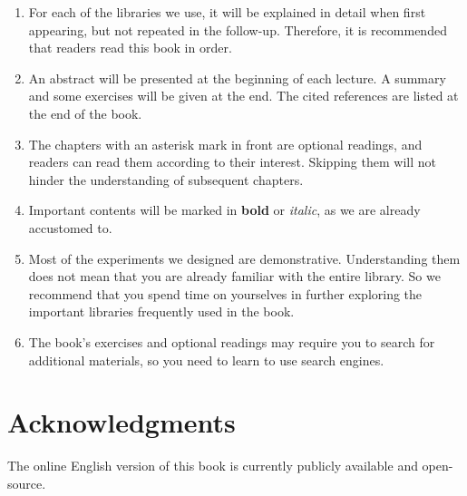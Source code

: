 \begin{enumerate}
	\item For each of the libraries we use, it will be explained in detail when first appearing, but not repeated in the follow-up. Therefore, it is recommended that readers read this book in order.
	
	\item An abstract will be presented at the beginning of each lecture. A summary and some exercises will be given at the end. The cited references are listed at the end of the book.

	\item The chapters with an asterisk mark in front are optional readings, and readers can read them according to their interest. Skipping them will not hinder the understanding of subsequent chapters.
	
	\item Important contents will be marked in \textbf{bold} or \emph{italic}, as we are already accustomed to.

	\item Most of the experiments we designed are demonstrative. Understanding them does not mean that you are already familiar with the entire library. So we recommend that you spend time on yourselves in further exploring the important libraries frequently used in the book.

	\item The book's exercises and optional readings may require you to search for additional materials, so you need to learn to use search engines.
\end{enumerate}

\section{Acknowledgments}
The online English version of this book is currently publicly available and open-source. %

